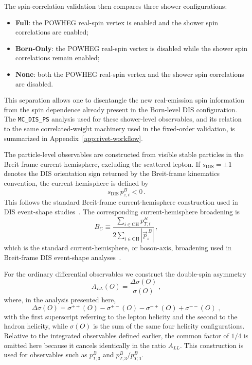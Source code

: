 \documentclass[a4paper,11pt]{article}
\begin{document}
The spin-correlation validation then compares three shower configurations:
\begin{itemize}
\item \textbf{Full}: the POWHEG real-spin vertex is enabled and the shower spin
  correlations are enabled;
\item \textbf{Born-Only}: the POWHEG real-spin vertex is disabled while the
  shower spin correlations remain enabled;
\item \textbf{None}: both the POWHEG real-spin vertex and the shower spin
  correlations are disabled.
\end{itemize}
This separation allows one to disentangle the new real-emission
spin information from the spin dependence already present in the Born-level
DIS configuration.
The \texttt{MC\_DIS\_PS} analysis used for these shower-level observables, and
its relation to the same correlated-weight machinery used in the fixed-order
validation, is summarized in Appendix~\ref{app:rivet-workflow}.

The particle-level observables are constructed from visible stable particles in
the Breit-frame current hemisphere, excluding the scattered lepton. If
$s_{\mathrm{DIS}}=\pm1$ denotes the DIS orientation sign returned by the
Breit-frame kinematics convention, the current hemisphere is defined by
\begin{equation}
  s_{\mathrm{DIS}}\,p_{z,i}^{B}<0\,.
\end{equation}
This follows the standard Breit-frame current-hemisphere construction used in
DIS event-shape studies~\cite{Dasgupta:2003iq,Gehrmann:2019hwf,H1:2006eventshapes,ZEUS:2007eventshapes}. The corresponding
current-hemisphere broadening is
\begin{equation}
  B_C
  \equiv
  \frac{\sum_{i\in \mathrm{CH}} p_{T,i}^{B}}
       {2\sum_{i\in \mathrm{CH}} |\vec{p}_i^{\,B}|}\,,
\end{equation}
which is the standard current-hemisphere, or boson-axis, broadening used in
Breit-frame DIS event-shape analyses~\cite{Dasgupta:2003iq,Gehrmann:2019hwf,H1:2006eventshapes,ZEUS:2007eventshapes}.

For the ordinary differential observables we construct the double-spin
asymmetry
\begin{equation}
  A_{LL}(O)=\frac{\Delta\sigma(O)}{\sigma(O)}\,,
\end{equation}
where, in the analysis presented here,
\begin{equation}
  \Delta\sigma(O)=\sigma^{++}(O)-\sigma^{+-}(O)-\sigma^{-+}(O)+\sigma^{--}(O)\;,
\end{equation}
with the first superscript referring to the lepton helicity and the second to the hadron helicity, while $\sigma(O)$ is the sum of the same four helicity configurations. Relative to the integrated observables defined earlier, the common factor of $1/4$ is omitted here because it cancels identically in the ratio $A_{LL}$. This construction is used for observables such as
$p_{T,3}^{B}$ and $p_{T,3}^{B}/p_{T,1}^{B}$.
\end{document}
